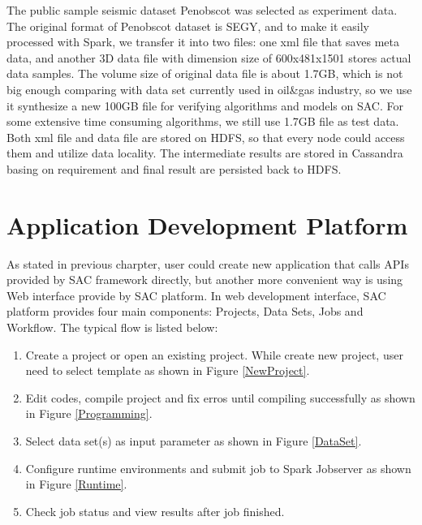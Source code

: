 The public sample seismic dataset Penobscot \cite{PenobscotData} was selected as experiment data. The original format of Penobscot dataset is SEGY, and to make it easily processed with Spark, we transfer it into two files: one xml file that saves meta data, and another 3D data file with dimension size of 600x481x1501 stores actual data samples. The volume size of original data file is about 1.7GB, which is not big enough comparing with data set currently used in oil\&gas industry, so we use it synthesize a new 100GB file for verifying algorithms and models on SAC. For some extensive time consuming algorithms, we still use 1.7GB file as test data. Both xml file and data file are stored on HDFS, so that every node could access them and utilize data locality. The intermediate results are stored in Cassandra basing on requirement and final result are persisted back to HDFS. 

\section{Application Development Platform}

As stated in previous charpter, user could create new application that calls APIs provided by SAC framework directly, but another more convenient way is using Web interface provide by SAC platform. In web development interface, SAC platform provides four main components: Projects, Data Sets, Jobs and Workflow. The typical flow is listed below:

\begin{enumerate}
  \item Create a project or open an existing project. While create new project, user need to select template as shown in Figure \ref{NewProject}.
  \item Edit codes, compile project and fix erros until compiling successfully as shown in Figure \ref{Programming}.
  \item Select data set(s) as input parameter as shown in Figure \ref{DataSet}.
  \item Configure runtime environments and submit job to Spark Jobserver as shown in Figure \ref{Runtime}.
  \item Check job status and view results after job finished.
\end{enumerate}

